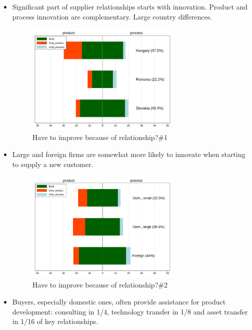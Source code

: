 \documentclass[final, dvipsnames, authoryear,12pt]{elsarticle}
\begin{document}
\begin{itemize}
    \item Significant part of supplier relationships starts with innovation. Product and process innovation are complementary. Large country differences.
    \begin{figure}[!h]
        \centering
        \includegraphics[width=0.7\textwidth]{graphs/Fig7a.png}
        \caption{Have to improve because of relationship?\#1}
        \label{fig:my_label}
    \end{figure}
    \item Large and foreign firms are somewhat more likely to innovate when starting to supply a new customer.
    \begin{figure}[!h]
        \centering
        \includegraphics[width=0.7\textwidth]{graphs/Fig7b.png}
        \caption{Have to improve because of relationship?\#2}
        \label{fig:my_label}
    \end{figure}
    \item Buyers, especially domestic ones, often provide assistance for product development: consulting in 1/4, technology transfer in 1/8 and asset transfer in 1/16 of key relationships.
    
\end{itemize}
\end{document}
